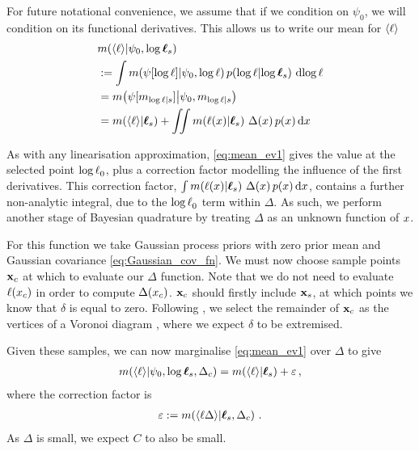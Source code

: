 \documentclass{article}
\begin{document}
For future notational convenience, we assume that if we condition on $\psi_0$, we will condition on its functional derivatives. This allows us to write our mean for  $\inty{\lfn}$
%
\begin{align}
& \mean{\inty{\lfn}}{\psi_0,\tvr_s} \nonumber\\
& \deq \int \mean{\psi[\tr]}{\psi_0,\tr}
\p{\tr}{\tvr_s}\, \ud \tr 
\nonumber\\
& = \mean{\psi[m_{\tr|s}]}{\psi_0,m_{\tr|s}} \nonumber\\
& = \mean{\inty{\lfn}}{\vr_s} + \iint \mean{\lfn(\lfv)}{\vr_s}\,
\Delta(\lfv)\,\po{\lfv}\ud\lfv
\label{eq:mean_ev1}
\end{align}

As with any linearisation approximation, \eqref{eq:mean_ev1} gives the value at the selected point $\tr_0$, plus a correction factor modelling the influence of the first derivatives. This correction factor, 
$\int \mean{\lfn(\lfv)}{\vr_s}\,
\Delta(\lfv)\,\po{\lfv}\ud\lfv$,
contains a further non-analytic integral, due to the $\tr_0$ term within $\Delta$. As such, we perform another stage of Bayesian quadrature by treating $\Delta$ as an unknown function of $\lfv$.


For this function we take Gaussian process priors with zero prior mean and Gaussian covariance \eqref{eq:Gaussian_cov_fn}. We must now choose sample points $\vlfv_c$ at which to evaluate our $\Delta$ function. 
Note that we do not need to evaluate $\lfn(\lfv_c)$ in order to compute $\Delta(\lfv_c)$.
$\vlfv_c$ should firstly include $\vlfv_s$, at which points we know that $\delta$ is equal to zero. Following \cite{BQR}, we select the remainder of $\vlfv_c$  as the  vertices of a Voronoi diagram \citep{okabe1997locational}, where we expect $\delta$ to be extremised. 

Given these samples, we can now marginalise \eqref{eq:mean_ev1} over $\Delta$ to give
\begin{align}
 \mean{\inty{\lfn}}{\psi_0,\tvr_s,\Delta_c} =
\mean{\inty{\lfn}}{\vr_s} + \corrn \,,
\label{eq:mean_ev2}
\end{align}
where the correction factor is
\begin{align*}
 \corrn \deq \mean{\inty{\lfn \Delta}}{\vr_s, \Delta_c}\,.
\end{align*}
As $\Delta$ is small, we expect $C$ to also be small.
\end{document}
